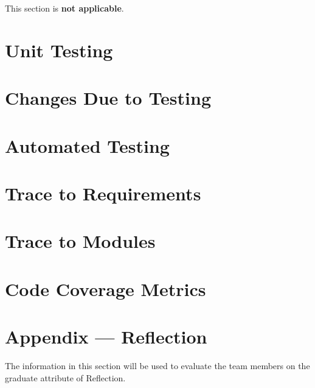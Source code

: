 \documentclass[12pt, titlepage]{article}
\begin{document}
This section is \textbf{not applicable}.

\section{Unit Testing}

\section{Changes Due to Testing}


\section{Automated Testing}
		
\section{Trace to Requirements}
		
\section{Trace to Modules}		

\section{Code Coverage Metrics}




\newpage{}
\section*{Appendix --- Reflection}

The information in this section will be used to evaluate the team members on the
graduate attribute of Reflection.


\end{document}
